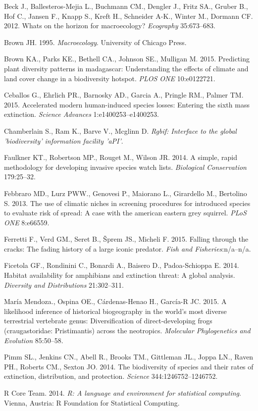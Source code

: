 \documentclass[author-year, review, 11pt]{components/elsarticle} %
\begin{document}
Beck J., Ballesteros-Mejia L., Buchmann CM., Dengler J., Fritz SA.,
Gruber B., Hof C., Jansen F., Knapp S., Kreft H., Schneider A-K., Winter
M., Dormann CF. 2012. Whats on the horizon for macroecology?
\emph{Ecography} 35:673--683.

Brown JH. 1995. \emph{Macroecology}. University of Chicago Press.

Brown KA., Parks KE., Bethell CA., Johnson SE., Mulligan M. 2015.
Predicting plant diversity patterns in madagascar: Understanding the
effects of climate and land cover change in a biodiversity hotspot.
\emph{PLOS ONE} 10:e0122721.

Ceballos G., Ehrlich PR., Barnosky AD., Garcia A., Pringle RM., Palmer
TM. 2015. Accelerated modern human-induced species losses: Entering the
sixth mass extinction. \emph{Science Advances} 1:e1400253--e1400253.

Chamberlain S., Ram K., Barve V., Mcglinn D. \emph{Rgbif: Interface to
the global 'biodiversity' information facility 'aPI'}.

Faulkner KT., Robertson MP., Rouget M., Wilson JR. 2014. A simple, rapid
methodology for developing invasive species watch lists.
\emph{Biological Conservation} 179:25--32.

Febbraro MD., Lurz PWW., Genovesi P., Maiorano L., Girardello M.,
Bertolino S. 2013. The use of climatic niches in screening procedures
for introduced species to evaluate risk of spread: A case with the
american eastern grey squirrel. \emph{PLoS ONE} 8:e66559.

Ferretti F., Verd GM., Seret B., {Š}prem JS., Micheli F. 2015. Falling
through the cracks: The fading history of a large iconic predator.
\emph{Fish and Fisheries}:n/a--n/a.

Ficetola GF., Rondinini C., Bonardi A., Baisero D., Padoa-Schioppa E.
2014. Habitat availability for amphibians and extinction threat: A
global analysis. \emph{Diversity and Distributions} 21:302--311.

Mar{í}a Mendoza., Ospina OE., C{á}rdenas-Henao H., Garc{í}a-R JC. 2015.
A likelihood inference of historical biogeography in the world's most
diverse terrestrial vertebrate genus: Diversification of
direct-developing frogs (craugastoridae: Pristimantis) across the
neotropics. \emph{Molecular Phylogenetics and Evolution} 85:50--58.

Pimm SL., Jenkins CN., Abell R., Brooks TM., Gittleman JL., Joppa LN.,
Raven PH., Roberts CM., Sexton JO. 2014. The biodiversity of species and
their rates of extinction, distribution, and protection. \emph{Science}
344:1246752--1246752.

R Core Team. 2014. \emph{R: A language and environment for statistical
computing}. Vienna, Austria: R Foundation for Statistical Computing.
\end{document}
